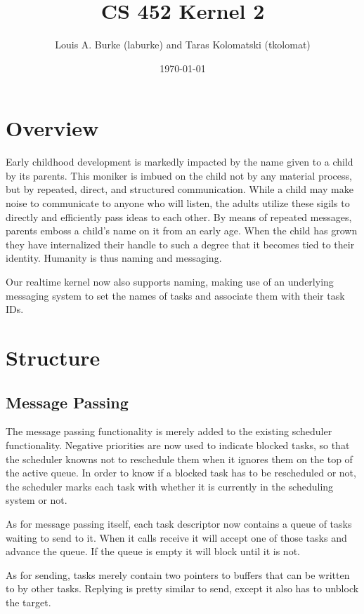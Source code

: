 \documentclass{article}
\title{CS 452 Kernel 2}
\author{Louis A. Burke (laburke) and Taras Kolomatski (tkolomat)}
\date{\today}
\begin{document}
\begingroup
\let\newpage\relax%
\maketitle
\endgroup

\section*{Overview}

Early childhood development is markedly impacted by the name given to a child by
its parents. This moniker is imbued on the child not by any material process,
but by repeated, direct, and structured communication. While a child may make
noise to communicate to anyone who will listen, the adults utilize these sigils
to directly and efficiently pass ideas to each other. By means of repeated
messages, parents emboss a child's name on it from an early age. When the child
has grown they have internalized their handle to such a degree that it becomes
tied to their identity. Humanity is thus naming and messaging.

Our realtime kernel now also supports naming, making use of an underlying
messaging system to set the names of tasks and associate them with their task
IDs.

\section*{Structure}

\subsection*{Message Passing}

The message passing functionality is merely added to the existing scheduler
functionality. Negative priorities are now used to indicate blocked tasks, so
that the scheduler knowns not to reschedule them when it ignores them on the top
of the active queue. In order to know if a blocked task has to be rescheduled or
not, the scheduler marks each task with whether it is currently in the
scheduling system or not.

As for message passing itself, each task descriptor now contains a queue of
tasks waiting to send to it. When it calls receive it will accept one of those
tasks and advance the queue. If the queue is empty it will block until it is
not.

As for sending, tasks merely contain two pointers to buffers that can be written
to by other tasks. Replying is pretty similar to send, except it also has to
unblock the target.
\end{document}

